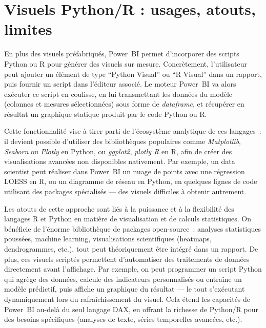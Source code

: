 \section{Visuels Python/R : usages, atouts, limites}
\label{sec:python-r-visuals}

En plus des visuels préfabriqués, Power~BI permet d’incorporer des scripts Python ou R pour générer des visuels sur mesure.  
Concrètement, l’utilisateur peut ajouter un élément de type ``Python Visual'' ou ``R Visual'' dans un rapport, puis fournir un script dans l’éditeur associé.  
Le moteur Power~BI va alors exécuter ce script en coulisse, en lui transmettant les données du modèle (colonnes et mesures sélectionnées) sous forme de \textit{dataframe}, et récupérer en résultat un graphique statique produit par le code Python ou R.

Cette fonctionnalité vise à tirer parti de l’écosystème analytique de ces langages~: il devient possible d’utiliser des bibliothèques populaires comme \textit{Matplotlib}, \textit{Seaborn} ou \textit{Plotly} en Python, ou \textit{ggplot2}, \textit{plotly R} en R, afin de créer des visualisations avancées non disponibles nativement.  
Par exemple, un data scientist peut réaliser dans Power~BI un nuage de points avec une régression LOESS en R, ou un diagramme de réseau en Python, en quelques lignes de code utilisant des packages spécialisés — des visuels difficiles à obtenir autrement.

Les atouts de cette approche sont liés à la puissance et à la flexibilité des langages R et Python en matière de visualisation et de calculs statistiques.  
On bénéficie de l’énorme bibliothèque de packages open-source~: analyses statistiques poussées, machine learning, visualisations scientifiques (heatmaps, dendrogrammes, etc.), tout peut théoriquement être intégré dans un rapport.  
De plus, ces visuels scriptés permettent d’automatiser des traitements de données directement avant l’affichage.  
Par exemple, on peut programmer un script Python qui agrège des données, calcule des indicateurs personnalisés ou entraîne un modèle prédictif, puis affiche un graphique du résultat — le tout s’exécutant dynamiquement lors du rafraîchissement du visuel.  
Cela étend les capacités de Power~BI au-delà du seul langage DAX, en offrant la richesse de Python/R pour des besoins spécifiques (analyses de texte, séries temporelles avancées, etc.).

